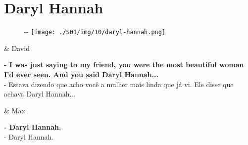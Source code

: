 \hypertarget{daryl-hannah}{%
\section{Daryl Hannah}\label{daryl-hannah}}

\begin{figure}[!ht]
  \begin{adjustwidth}{-\oddsidemargin-1in}{-\rightmargin}
    \centering
    \texttt{[image: ./S01/img/10/daryl-hannah.png]}
  \end{adjustwidth}
\end{figure}

\begin{tcolorbox}[enhanced,center upper,
    drop fuzzy shadow southeast, boxrule=0.3pt,
    lower separated=false,
    colframe=black!30!dialogoBorder,colback=white]
\begin{minipage}[c]{0.16\linewidth}
   & \centering \scriptsize{David}
\end{minipage}
\hfill
\begin{minipage}[c]{0.8\linewidth}
  \textbf{- I was just saying to my friend, you were the most beautiful woman I'd ever seen. And you said Daryl Hannah...}\\
  - Estava dizendo que acho você a mulher mais linda que já vi. Ele disse que achava Daryl Hannah...
\end{minipage}

\medskip
\begin{minipage}[c]{0.16\linewidth}
   & \centering \scriptsize{Max}
\end{minipage}
\hfill
\begin{minipage}[c]{0.8\linewidth}
  \textbf{- Daryl Hannah.}\\
  - Daryl Hannah.
\end{minipage}
\end{tcolorbox}


